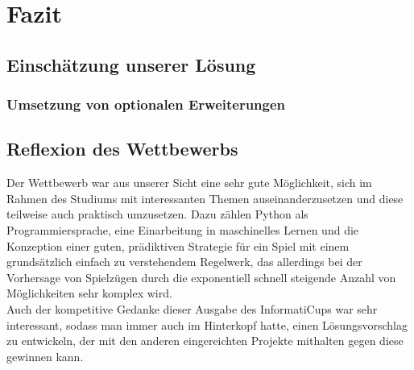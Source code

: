 \chapter{Fazit}
\label{ch:fazit}

\section{Einschätzung unserer Lösung}
\label{sec:einschaetzuung}


\subsection{Umsetzung von optionalen Erweiterungen}
\label{subsec:optionale-erweiterungen}


\section{Reflexion des Wettbewerbs}
\label{sec:reflexion}

Der Wettbewerb war aus unserer Sicht eine sehr gute Möglichkeit, sich im Rahmen des Studiums mit interessanten Themen
auseinanderzusetzen und diese teilweise auch praktisch umzusetzen.
Dazu zählen \ua Python als Programmiersprache, eine Einarbeitung in maschinelles Lernen und die Konzeption einer
guten, prädiktiven Strategie für ein Spiel mit einem grundsätzlich einfach zu verstehendem Regelwerk, das allerdings
bei der Vorhersage von Spielzügen durch die exponentiell schnell steigende Anzahl von Möglichkeiten sehr komplex wird.
\\

Auch der kompetitive Gedanke dieser Ausgabe des InformatiCups war sehr interessant, sodass man immer auch im
Hinterkopf hatte, einen Lösungsvorschlag zu entwickeln, der mit den anderen eingereichten Projekte mithalten \bzw
gegen diese gewinnen kann.
